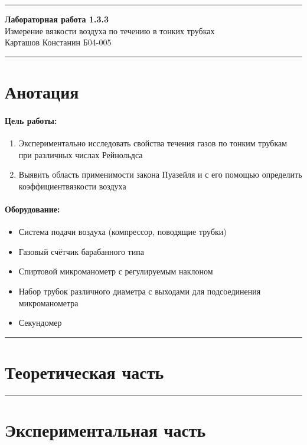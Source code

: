\documentclass[a4paper,12pt]{article} %
\begin{document}
\hrule 	
\medskip
\begin{raggedright}
{\large \textbf{Лабораторная работа 1.3.3}}
\\
\medskip
{\Large Измерение вязкости воздуха по течению в тонких трубках} 
\\
\medskip
{\large Карташов Констанин Б04-005}
\medskip
\hrule
\medskip
\end{raggedright}


\section{Анотация}

\paragraph{Цель работы:} 
\begin{enumerate}
\itemsep0em
\item Экспериментально исследовать свойства течения газов по тонким трубкам при различных числах Рейнольдса 
\item Выявить область применимости закона Пуазейля и с его помощью определить коэффициентвязкости воздуха
\end{enumerate}
\paragraph{Оборудование:}
\begin{itemize}
\renewcommand{\labelitemi}{$\triangleright$}
\itemsep0em
\item Система подачи воздуха (компрессор, поводящие трубки)
\item Газовый счётчик барабанного типа 
\item Спиртовой микроманометр с регулируемым наклоном 
\item Набор трубок различного диаметра с выходами для подсоединения микроманометра
\item Секундомер
\end{itemize}

\medskip\hrule\medskip

\section{Теоретическая часть}

\medskip\hrule\medskip

\section{Экспериментальная часть}
\end{document}
